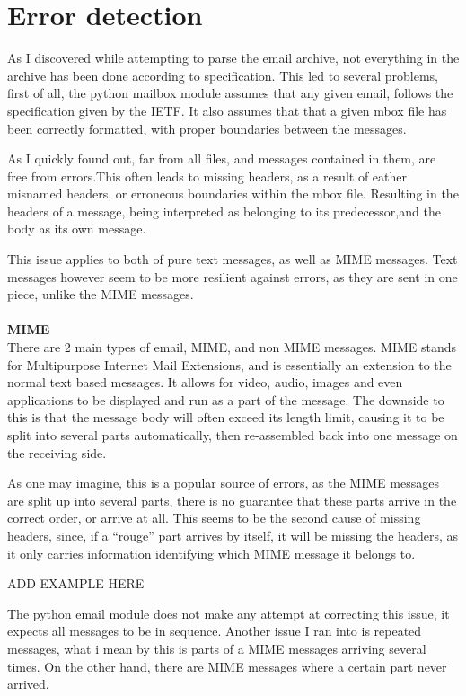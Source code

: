 \documentclass{report}
\begin{document}
\section{Error detection}
As I discovered while attempting to parse the email archive, not everything in the archive has been done according to specification. This led to several problems, first of all, the python mailbox module assumes that any given email, follows the specification given by the IETF. 
It also assumes that that a given mbox file has been correctly formatted, with proper boundaries between the messages.

As I quickly found out, far from all files, and messages contained in them, are free from errors.This often leads to missing headers, as a result of eather misnamed headers, or erroneous boundaries within the mbox file. Resulting in the headers of a message, being interpreted as belonging to its predecessor,and the body as its own message.

This issue applies to both of pure text messages, as well as MIME messages. Text messages however seem to be more resilient against errors, as they are sent in one piece, unlike the MIME messages.\\\\

\noindent
\textbf{MIME}\\

There are 2 main types of email, MIME, and non MIME messages.
MIME stands for Multipurpose Internet Mail Extensions, and is essentially an extension to the normal text based messages. It allows for video, audio, images and even applications to be displayed and run as a part of the message. The downside to this  is that the message body will often exceed its length limit, causing it to be split into several parts automatically, then re-assembled back into one message on the receiving side.

As one may imagine, this is a popular source of errors, as the MIME messages are split up into several parts, there is no guarantee that these parts arrive in the correct order, or arrive at all. This seems to be the second cause of missing headers, since, if a “rouge” part arrives by itself, it will be missing the headers, as it only carries information identifying which MIME message it belongs to. 

ADD EXAMPLE HERE


The python email module does not make any attempt at correcting this issue, it expects all messages to be in sequence. 
Another issue I ran into is repeated messages, what i mean by this is parts of a MIME messages arriving several times.
On the other hand, there are MIME messages where a certain part never arrived.
\end{document}
